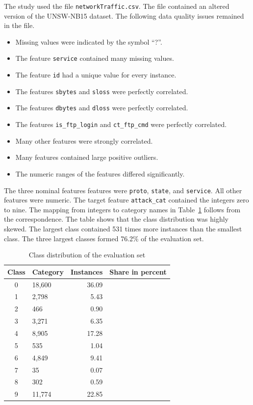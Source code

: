 \documentclass[conference]{IEEEtran}
\begin{document}
The study used the file \texttt{networkTraffic.csv}.
The file contained an altered version of the UNSW-NB15 dataset.
The following data quality issues remained in the file.

\begin{itemize}
    \item Missing values were indicated by the symbol ``?''.
    \item The feature \texttt{service} contained many missing values.
    \item The feature \texttt{id} had a unique value for every instance.
    \item The features \texttt{sbytes} and \texttt{sloss} were perfectly correlated.
    \item The features \texttt{dbytes} and \texttt{dloss} were perfectly correlated.
    \item The features \texttt{is\_ftp\_login} and \texttt{ct\_ftp\_cmd} were perfectly correlated.
    \item Many other features were strongly correlated.
    \item Many features contained large positive outliers.
    \item The numeric ranges of the features differed significantly.
\end{itemize}

The three nominal features features were \texttt{proto}, \texttt{state}, and \texttt{service}.
All other features were numeric.
The target feature \texttt{attack\_cat} contained the integers zero to nine.
The mapping from integers to category names in Table~\ref{tab:classes} follows from the correspondence.
The table shows that the class distribution was highly skewed.
The largest class contained 531 times more instances than the smallest class.
The three largest classes formed 76.2\% of the evaluation set.

\begin{table}[H]
\centering
\caption{Class distribution of the evaluation set}
\label{tab:classes}
\footnotesize
\begin{tabular}{clrr}
\toprule
\textbf{Class} & \textbf{Category} & \textbf{Instances} & \textbf{Share in percent} \\
\midrule
0 & 18,600 & 36.09 \\
1 & 2,798 & 5.43 \\
2 & 466 & 0.90 \\
3 & 3,271 & 6.35 \\
4 & 8,905 & 17.28 \\
5 & 535 & 1.04 \\
6 & 4,849 & 9.41 \\
7 & 35 & 0.07 \\
8 & 302 & 0.59 \\
9 & 11,774 & 22.85 \\
\bottomrule
\end{tabular}
\end{table}
\end{document}
